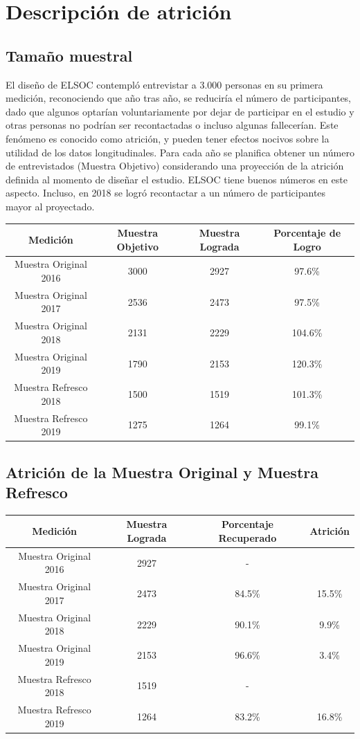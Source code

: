 \documentclass[
  12pt,
]{book}
\begin{document}
\hypertarget{descripciuxf3n-de-atriciuxf3n}{%
\chapter{Descripción de atrición}\label{descripciuxf3n-de-atriciuxf3n}}

\hypertarget{tamauxf1o-muestral}{%
\section{Tamaño muestral}\label{tamauxf1o-muestral}}

El diseño de ELSOC contempló entrevistar a 3.000 personas en su primera medición, reconociendo que año tras año, se reduciría el número de participantes, dado que algunos optarían voluntariamente por dejar de participar en el estudio y otras personas no podrían ser recontactadas o incluso algunas fallecerían. Este fenómeno es conocido como atrición, y pueden tener efectos nocivos sobre la utilidad de los datos longitudinales. Para cada año se planifica obtener un número de entrevistados (Muestra Objetivo) considerando una proyección de la atrición definida al momento de diseñar el estudio. ELSOC tiene buenos números en este aspecto. Incluso, en 2018 se logró recontactar a un número de participantes mayor al proyectado.

\begin{longtable}[]{@{}cccc@{}}
\toprule
Medición & Muestra Objetivo & Muestra Lograda & Porcentaje de Logro\tabularnewline
\midrule
\endhead
Muestra Original 2016 & 3000 & 2927 & 97.6\%\tabularnewline
Muestra Original 2017 & 2536 & 2473 & 97.5\%\tabularnewline
Muestra Original 2018 & 2131 & 2229 & 104.6\%\tabularnewline
Muestra Original 2019 & 1790 & 2153 & 120.3\%\tabularnewline
Muestra Refresco 2018 & 1500 & 1519 & 101.3\%\tabularnewline
Muestra Refresco 2019 & 1275 & 1264 & 99.1\%\tabularnewline
\bottomrule
\end{longtable}

\hypertarget{atriciuxf3n-de-la-muestra-original-y-muestra-refresco}{%
\section{Atrición de la Muestra Original y Muestra Refresco}\label{atriciuxf3n-de-la-muestra-original-y-muestra-refresco}}

\begin{longtable}[]{@{}cccc@{}}
\toprule
Medición & Muestra Lograda & Porcentaje Recuperado & Atrición\tabularnewline
\midrule
\endhead
Muestra Original 2016 & 2927 & - &\tabularnewline
Muestra Original 2017 & 2473 & 84.5\% & 15.5\%\tabularnewline
Muestra Original 2018 & 2229 & 90.1\% & 9.9\%\tabularnewline
Muestra Original 2019 & 2153 & 96.6\% & 3.4\%\tabularnewline
Muestra Refresco 2018 & 1519 & - &\tabularnewline
Muestra Refresco 2019 & 1264 & 83.2\% & 16.8\%\tabularnewline
\bottomrule
\end{longtable}
\end{document}
